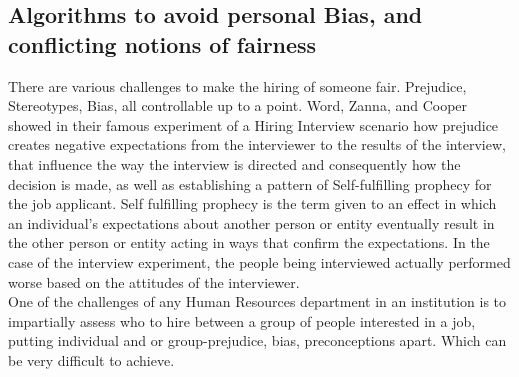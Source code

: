 \subsection{Algorithms to avoid personal Bias, and conflicting notions of fairness}
There are various challenges to make the hiring of someone fair. Prejudice, Stereotypes, Bias, all controllable up to a point. Word, Zanna, and Cooper showed in their famous experiment of a Hiring Interview scenario \cite{WZC74} how prejudice creates negative expectations from the interviewer to the results of the interview, that influence the way the interview is directed and consequently how the decision is made, as well as establishing a pattern of Self-fulfilling prophecy for the job applicant. Self fulfilling prophecy is the term given to an effect in which an individual's expectations about another person or entity eventually result in the other person or entity acting in ways that confirm the expectations. In the case of the interview experiment, the people being interviewed actually performed worse based on the attitudes of the interviewer. \\
One of the challenges of any Human Resources department in an institution is to impartially assess  who to hire between a group of people interested in a job, putting individual and or group-prejudice, bias, preconceptions apart. Which can be very difficult to achieve.\\


